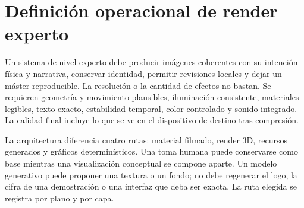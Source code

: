 \def\paperRoman{III}


\begin{abstract}
Se propone un motor de producción híbrido que integra tomas reales, geometría tridimensional, render físicamente basado, recursos generativos controlados y composición tipográfica exacta. La contribución se sitúa en la coordinación de estos componentes: especificación de escena, restricciones de identidad y evidencia, presupuestos de error y decisiones de cómputo auditables. Se formalizan la ecuación de transporte de luz, un estimador Monte Carlo, muestreo por importancia, regularización temporal y asignación de muestras bajo presupuesto. La gestión de color se separa en cálculo radiométrico, apariencia de escena y gráficos de marca. El modelo QAF se considera una capa opcional de planificación de dependencias y recursos; su estado complejo no se confunde con radiancia óptica. Se especifica un benchmark para comparar calidad, tiempo y memoria frente a motores clásicos igualmente configurados, y se describe la transición desde el compositor Python existente. El resultado es una arquitectura para investigar acabado profesional con criterios de aceptación y límites reproducibles.
\end{abstract}

\section{Definición operacional de render experto}
Un sistema de nivel experto debe producir imágenes coherentes con su intención física y narrativa, conservar identidad, permitir revisiones locales y dejar un máster reproducible. La resolución o la cantidad de efectos no bastan. Se requieren geometría y movimiento plausibles, iluminación consistente, materiales legibles, texto exacto, estabilidad temporal, color controlado y sonido integrado. La calidad final incluye lo que se ve en el dispositivo de destino tras compresión.

La arquitectura diferencia cuatro rutas: material filmado, render 3D, recursos generados y gráficos determinísticos. Una toma humana puede conservarse como base mientras una visualización conceptual se compone aparte. Un modelo generativo puede proponer una textura o un fondo; no debe regenerar el logo, la cifra de una demostración o una interfaz que deba ser exacta. La ruta elegida se registra por plano y por capa.

